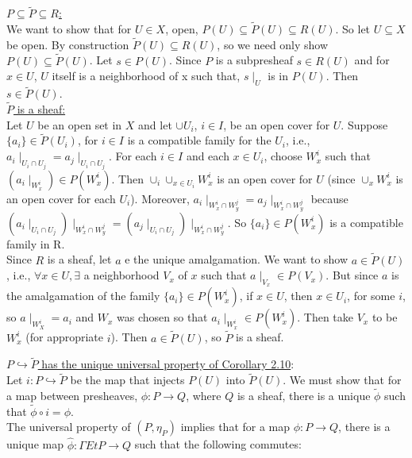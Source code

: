 \underline{$P \subseteq \tilde{P} \subseteq R$:}\\
We want to show that for $U \in X$, open, $P(U) \subseteq \tilde{P}(U) \subseteq R(U)$. So let $U \subseteq X$ be open. By construction $\tilde{P}(U) \subseteq R(U)$, so we need only show $P(U) \subseteq \tilde {P}(U)$. Let $s \in P(U)$. Since $P$ is a subpresheaf $s \in R(U)$ and for $x \in U$, $U$ itself is a neighborhood of x such that, $s \mid_U$ is in $P(U)$. Then $s \in \tilde{P}(U)$. \\

\underline{$\tilde{P}$ is a sheaf:}\\
Let $U$ be an open set in $X$ and let $\cup U_i$, $i \in I$, be an open cover for $U$. Suppose $\{a_i\} \in \tilde{P}(U_i)$, for $i \in I$ is a compatible family for the $U_i$, i.e., $a_i \mid_{U_i \cap U_j} =a_j \mid_{U_i \cap U_j}$.
For each $i \in I$ and each $x \in U_i$, choose $W_x^i$ such that $(a_i \mid_{W_x^i}) \in P(W_x^i)$. Then $\cup_i \cup_{x \in U_i} W_x^i$ is an open cover for $U$ (since $\cup_x W_x^i$ is an open cover for each $U_i$). Moreover, $a_i \mid_{W_x^i \cap W_y^j}=a_j \mid_{W_x^i \cap W_y^j}$ because $(a_i \mid_{U_i \cap U_j}) \mid_{W_x^i \cap W_y^j}=(a_j\mid_{U_i \cap U_j}) \mid_{W_x^i \cap W_y^j}$. So $\{a_i\} \in P(W_x^i)$ is a compatible family in R.\\

Since $R$ is a sheaf, let $a$ e the unique amalgamation. We want to show $a \in \tilde{P}(U)$, i.e., $\forall x \in U, \exists$ a neighborhood $V_x$ of $x$ such that $a \mid_{V_x} \in P(V_x)$. But since $a$ is the amalgamation of the family $\{a_i\} \in P(W_x^i)$, if $x \in U$, then $x \in U_i$, for some $i$, so $a \mid_{W_X^i} = a_i$ and $W_x$ was chosen so that $a_i \mid_{W_x^i} \in P(W_x^i)$. Then take $V_x$ to be $W_x^i$ (for appropriate $i$). Then $a \in \tilde{P}(U)$, so $\tilde{P}$ is a sheaf. \newpage

\underline{$P \hookrightarrow \tilde{P}$ has the unique universal property of Corollary 2.10}:\\

Let $i: P \hookrightarrow \tilde{P}$ be the map that injects $P(U)$ into $\tilde{P}(U)$. We must show that for a map between presheaves, $\phi: P \rightarrow Q$, where $Q$ is a sheaf, there is a unique $\tilde{\phi}$ such that $\tilde{\phi} \circ i = \phi$. \\
The universal property of $(P, \eta_P)$ implies that for a map $\phi: P \rightarrow Q$, there is a unique map $\hat{\phi}: \Gamma EtP \rightarrow Q$ such that the following commutes:

